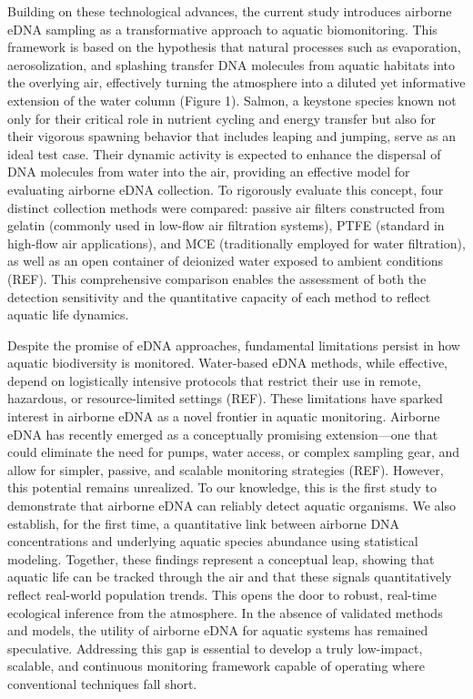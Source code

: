 \documentclass{article}
\begin{document}
Building on these technological advances, the current study introduces airborne eDNA sampling as a transformative approach to aquatic biomonitoring. This framework is based on the hypothesis that natural processes such as evaporation, aerosolization, and splashing transfer DNA molecules from aquatic habitats into the overlying air, effectively turning the atmosphere into a diluted yet informative extension of the water column (Figure 1). Salmon, a keystone species known not only for their critical role in nutrient cycling and energy transfer but also for their vigorous spawning behavior that includes leaping and jumping, serve as an ideal test case. Their dynamic activity is expected to enhance the dispersal of DNA molecules from water into the air, providing an effective model for evaluating airborne eDNA collection. To rigorously evaluate this concept, four distinct collection methods were compared: passive air filters constructed from gelatin (commonly used in low-flow air filtration systems), PTFE (standard in high-flow air applications), and MCE (traditionally employed for water filtration), as well as an open container of deionized water exposed to ambient conditions (REF). This comprehensive comparison enables the assessment of both the detection sensitivity and the quantitative capacity of each method to reflect aquatic life dynamics.

Despite the promise of eDNA approaches, fundamental limitations persist in how aquatic biodiversity is monitored. Water-based eDNA methods, while effective, depend on logistically intensive protocols that restrict their use in remote, hazardous, or resource-limited settings (REF). These limitations have sparked interest in airborne eDNA as a novel frontier in aquatic monitoring. Airborne eDNA has recently emerged as a conceptually promising extension—one that could eliminate the need for pumps, water access, or complex sampling gear, and allow for simpler, passive, and scalable monitoring strategies (REF). However, this potential remains unrealized. To our knowledge, this is the first study to demonstrate that airborne eDNA can reliably detect aquatic organisms. We also establish, for the first time, a quantitative link between airborne DNA concentrations and underlying aquatic species abundance using statistical modeling. Together, these findings represent a conceptual leap, showing that aquatic life can be tracked through the air and that these signals quantitatively reflect real-world population trends. This opens the door to robust, real-time ecological inference from the atmosphere. In the absence of validated methods and models, the utility of airborne eDNA for aquatic systems has remained speculative. Addressing this gap is essential to develop a truly low-impact, scalable, and continuous monitoring framework capable of operating where conventional techniques fall short.
\end{document}

